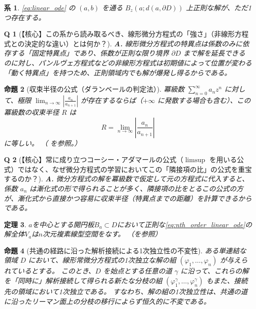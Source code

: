 \documentclass[paper=a4, fontsize=11pt]{jlreq} %
\theoremstyle{break}
\newtheorem{theorem}{定理}[section]
\newtheorem{proposition}[theorem]{命題}
\newtheorem{corollary}[theorem]{系}
\theoremstyle{qa}
\newtheorem*{Q}{Q}
\theoremstyle{remark} %
\begin{document}
\begin{corollary}\label{cor:linear_maximal_disk}
    \eqref{eq:linear_ode} の $(a,b)$ を通る $B_{z}(a;d(a,\partial D))$ 上正則な解が、ただ1つ存在する。
\end{corollary}

\begin{Q}[【核心】この系から読み取るべき、線形微分方程式の「強さ」（非線形方程式との決定的な違い）とは何か？]
\textbf{A.} 線形微分方程式の特異点は係数のみに依存する「固定特異点」であり、係数が正則な限り境界 $\partial D$ まで解を延長できるのに対し、パンルヴェ方程式などの非線形方程式は初期値によって位置が変わる「動く特異点」を持つため、正則領域内でも解が爆発し得るからである。
\end{Q}
\begin{proposition}[収束半径の公式（ダランベールの判定法）]\label{prop:dalembert_radius}
    冪級数 $\sum_{n=0}^{\infty}a_{n}z^{n}$ に対して、極限 $\lim_{n\to\infty}\left|\frac{a_{n}}{a_{n+1}}\right|$ が存在するならば（$+\infty$ に発散する場合も含む）、この冪級数の収束半径 $R$ は
    \begin{equation}
        R = \lim_{n\to\infty}\left|\frac{a_{n}}{a_{n+1}}\right|
    \end{equation}
    に等しい。
    （\cite[p.33 定理2.4.4]{book:noguchi} を参照。）
\end{proposition}

\begin{Q}[【核心】常に成り立つコーシー・アダマールの公式（$\limsup$ を用いる公式）ではなく、なぜ微分方程式の学習においてこの「隣接項の比」の公式を重宝するのか？]
\textbf{A.} 微分方程式の解を冪級数で仮定して元の方程式に代入すると、係数 $a_n$ は漸化式の形で得られることが多く、隣接項の比をとるこの公式の方が、漸化式から直接かつ容易に収束半径（特異点までの距離）を計算できるからである。
\end{Q}
\begin{theorem}\label{thm:solution_space_dimension}
    $a$を中心とする開円板$B_{a}\subset D$において正則な\eqref{eq:nth_order_linear_ode}の解全体$V_{a}$は$n$次元複素線型空間をなす。
    （\cite[p.78 定理11.2]{book:takano}を参照）
\end{theorem}
\begin{proposition}[共通の経路に沿った解析接続による1次独立性の不変性]\label{prop:independence_branch_invariance}
    ある単連結な領域 $D$ において、線形常微分方程式の1次独立な解の組 $(\varphi_1, \dots, \varphi_n)$ が与えられているとする。
    このとき、$D$ を始点とする任意の道 $\gamma$ に沿って、これらの解を「同時に」解析接続して得られる新たな分枝の組 $(\varphi_1^\gamma, \dots, \varphi_n^\gamma)$ もまた、接続先の領域において1次独立である。
    すなわち、解の組の1次独立性は、共通の道に沿ったリーマン面上の分枝の移行によらず恒久的に不変である。
\end{proposition}
\end{document}
